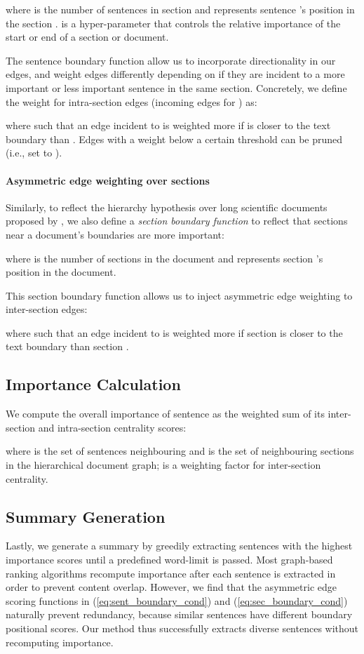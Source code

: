 \documentclass[11pt,a4paper]{article}
\begin{document}
where  is the number of sentences in section   and  represents sentence 's position in the section .   is a hyper-parameter that controls the relative importance of the start or end of a section or document.   

The sentence boundary function allow us to incorporate directionality in our edges, and weight edges differently depending on if they are incident to a more important or less important sentence in the same section. Concretely, we define the weight  for intra-section edges (incoming edges for ) as:

where  such that an edge  incident to  is weighted more if  is closer to the text boundary than . Edges with a weight below a certain threshold  can be pruned (i.e., set to ). 
    
\paragraph{Asymmetric edge weighting over sections}
Similarly, to reflect the hierarchy hypothesis over long scientific documents proposed by \citet{teufel1997sentence}, we also define a \textit{section boundary function}  to reflect that sections near a document's boundaries are more important:

where  is the number of sections in the document  and  represents section 's position in the document.  

This section boundary function allows us to inject asymmetric edge weighting  to inter-section edges:
    
where  such that an edge  incident to  is weighted more if section  is closer to the text boundary than section . 
    
\subsection{Importance Calculation}\label{sub-sec:method_centrality}
We compute the overall importance of sentence  as the weighted sum of its inter-section and intra-section centrality scores:
  
    
  
where  is the set of sentences neighbouring  and  is the set of neighbouring sections in the hierarchical document graph;  is a weighting factor for  inter-section centrality.

\subsection{Summary Generation}\label{sub-sec:method_generation}
Lastly, we generate a summary by greedily extracting sentences with the highest importance scores until a predefined word-limit  is passed. Most graph-based ranking algorithms recompute importance after each sentence is extracted in order to prevent content overlap. However, we find that the asymmetric edge scoring functions in (\ref{eq:sent_boundary_cond}) and (\ref{eq:sec_boundary_cond}) naturally prevent redundancy, because similar sentences have different boundary positional scores. Our method thus successfully extracts diverse sentences without recomputing importance.
\end{document}
